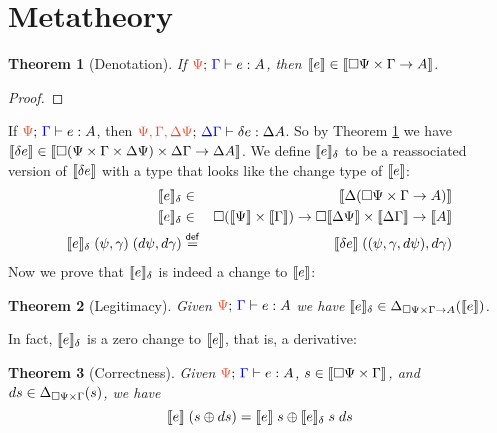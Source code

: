 \documentclass{article}
\theoremstyle{plain}
\newtheorem{theorem}{Theorem}
\theoremstyle{definition}
\begin{document}

\section{Metatheory}

\begin{theorem}[Denotation]
  \label{thm:denotation}
  If $\J{\GP}{\GG}{e}{A}$, then $\llbracket{e}\rrbracket \in {\llbracket{\square{\Psi} \times\Gamma\to A}\rrbracket}$.
\end{theorem}
\begin{proof}
\end{proof}

\newcommand{\dendelta}[1]{\den{#1}_\delta}

If $\J{\GP}{\GG}{e}{A}$, then $\J{\GP, \GG, \Ch\GP}{\Ch\GG}{\delta e}{\Ch A}$.
%
So by Theorem \ref{thm:denotation} we have
$\llbracket{\delta e}\rrbracket \in {\llbracket{\square{(\Psi\times\Gamma\times\Delta\Psi)} \times\Delta\Gamma\to \Delta A}\rrbracket}$.
%
We define $\dendelta{e}$ to be a reassociated version of
$\llbracket{\delta e}\rrbracket$ with a type that looks like the change type of $\llbracket{e}\rrbracket$:
%
\begin{eqnarray*}
  \dendelta{e} &\in& \Den{\Ch (\Disc{\GP} \x \GG \to A) }\\
  \dendelta{e} &\in& \Disc{(\Den{\GP} \x \Den{\GG})}
    \to \Disc{\Den{\Ch\GP}} \x \Den{\Ch\GG}  \to \Den{A}\\
  \dendelta{e} \; (\psi, \gamma) \; (d\psi, d\gamma)
  &\defeq& \den{\delta e} \; ((\psi, \gamma, d\psi), d\gamma)
\end{eqnarray*}
%
Now we prove that $\dendelta{e}$ is indeed a change to $\llbracket{e}\rrbracket$:

\begin{theorem}[Legitimacy]
  Given $\J{\GP}{\GG}{e}{A}$ we have
  $\dendelta{e} \in \Change{\Disc{\Psi} \x \GG \to A}{\den{e}}$.
\end{theorem}

In fact, $\dendelta{e}$ is a zero change to $\llbracket{e}\rrbracket$, that is, a derivative:

\begin{theorem}[Correctness]
  Given $\J{\GP}{\GG}{e}{A}$, $s \in {\llbracket{\square{\Psi} \times\Gamma}\rrbracket}$,
  and $ds \in \Delta_{\square{\Psi} \times \Gamma}({s})$, we have
  \begin{equation*}
    \den{e}\; (s \oplus ds)
    =
    \den{e}\; s \oplus \dendelta{e} \; s \; ds
  \end{equation*}


\end{theorem}
\end{document}
